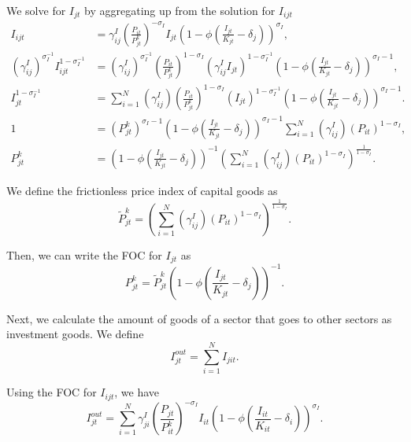 We solve for $I_{jt}$ by aggregating up from the solution for $I_{ijt}$
\begin{align*}
I_{ijt} & =\gamma_{ij}^{I}\left(\frac{{P_{it}}}{P_{jt}^{k}}\right)^{-\sigma_{I}}I_{jt}\left(1-\phi\left(\frac{I_{jt}}{K_{jt}}-\delta_{j}\right)\right)^{\sigma_{I}},\\
\left(\gamma_{ij}^{I}\right)^{\sigma_{I}^{-1}}I_{ijt}^{1-\sigma_{I}^{-1}} & =\left(\gamma_{ij}^{I}\right)^{\sigma_{I}^{-1}}\left(\frac{{P_{it}}}{P_{jt}^{k}}\right)^{1-\sigma_{I}}\left(\gamma_{ij}^{I}I_{jt}\right)^{1-\sigma_{I}^{-1}}\left(1-\phi\left(\frac{I_{jt}}{K_{jt}}-\delta_{j}\right)\right)^{\sigma_{I}-1},\\
I_{jt}^{1-\sigma_{I}^{-1}} & =\sum_{i=1}^{N}\left(\gamma_{ij}^{I}\right)\left(\frac{{P_{it}}}{P_{jt}^{k}}\right)^{1-\sigma_{I}}\left(I_{jt}\right)^{1-\sigma_{I}^{-1}}\left(1-\phi\left(\frac{I_{jt}}{K_{jt}}-\delta_{j}\right)\right)^{\sigma_{I}-1}.\\
1 & =\left(P_{jt}^{k}\right)^{\sigma_{I}-1}\left(1-\phi\left(\frac{I_{jt}}{K_{jt}}-\delta_{j}\right)\right)^{\sigma_{I}-1}\sum_{i=1}^{N}\left(\gamma_{ij}^{I}\right)\left(P_{it}\right)^{1-\sigma_{I}},\\
P_{jt}^{k} & =\left(1-\phi\left(\frac{I_{jt}}{K_{jt}}-\delta_{j}\right)\right)^{-1}\left(\sum_{i=1}^{N}\left(\gamma_{ij}^{I}\right)\left(P_{it}\right)^{1-\sigma_{I}}\right)^{\frac{{1}}{1-\sigma_{I}}}.
\end{align*}

We define the frictionless price index of capital goods as 
\[
\tilde{{P}}_{jt}^{k}=\left(\sum_{i=1}^{N}\left(\gamma_{ij}^{I}\right)\left(P_{it}\right)^{1-\sigma_{I}}\right)^{\frac{{1}}{1-\sigma_{I}}}.
\]

Then, we can write the FOC for $I_{jt}$ as 
\[
P_{jt}^{k}=\tilde{{P}}_{jt}^{k}\left(1-\phi\left(\frac{I_{jt}}{K_{jt}}-\delta_{j}\right)\right)^{-1}.
\]

Next, we calculate the amount of goods of a sector that goes to other
sectors as investment goods. We define
\[
I_{jt}^{out}=\sum_{i=1}^{N}I_{jit}.
\]

Using the FOC for $I_{ijt}$, we have
\[
I_{jt}^{out}=\sum_{i=1}^{N}\gamma_{ji}^{I}\left(\frac{{P_{jt}}}{P_{it}^{k}}\right)^{-\sigma_{I}}I_{it}\left(1-\phi\left(\frac{I_{it}}{K_{it}}-\delta_{i}\right)\right)^{\sigma_{I}}.
\]


